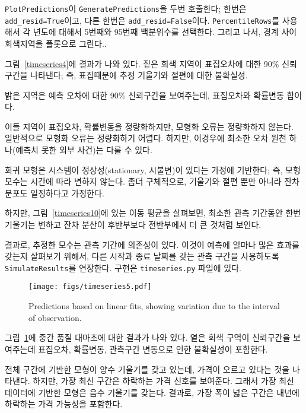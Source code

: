 {\tt PlotPredictions}이 {\tt GeneratePredictions}을 두번 호출한다; 한번은 \verb"add_resid=True"이고, 다른 한번은 \verb"add_resid=False"이다.
{\tt PercentileRows}를 사용해서 각 년도에 대해서 5번째와 95번째 백분위수를 선택한다. 그리고 나서, 경계 사이 회색지역을 플롯으로 그린다..

그림~\ref{timeseries4}에 결과가 나와 있다.
짙은 회색 지역이 표집오차에 대한 90\% 신뢰구간을 나타낸다; 즉,
표집때문에 추정 기울기와 절편에 대한 불확실성.

밝은 지역은 예측 오차에 대한 90\% 신뢰구간을 보여주는데,
표집오차와 확률변동 합이다.

이들 지역이 표집오차, 확률변동을 정량화하지만, 모형화 오류는 정량화하지 않는다. 일반적으로 모형화 오류는 정량화하기 어렵다. 하지만, 이경우에 최소한 오차 원천 하나(예측치 못한 외부 사건)는 다룰 수 있다.

회귀 모형은 시스템이 정상성(stationary, 시불변)이 있다는 가정에 기반한다; 즉, 모형 모수는 시간에 따라 변하지 않는다.
좀더 구체적으로, 기울기와 절편 뿐만 아니라 잔차 분포도 일정하다고 가정한다.

하지만, 그림~\ref{timeseries10}에 있는 이동 평균을 살펴보면, 최소한 관측 기간동안 한번 기울기는 변하고 잔차 분산이 후반부보다 전반부에서 더 큰 것처럼 보인다.

결과로, 추정한 모수는 관측 기간에 의존성이 있다.
이것이 예측에 얼마나 많은 효과를 갖는지 살펴보기 위해서,
다른 시작과 종료 날짜를 갖는 관측 구간을 사용하도록 {\tt SimulateResults}를 연장한다.
구현은 {\tt timeseries.py} 파일에 있다.

\begin{figure}
\centerline{\texttt{[image: figs/timeseries5.pdf]}}
\caption{Predictions based on linear fits, showing
variation due to the interval of observation.}
\label{timeseries5}
\end{figure}

그림~\ref{timeseries5}에 중간 품질 대마초에 대한 결과가 나와 있다.
옅은 회색 구역이 신뢰구간을 보여주는데 표집오차, 확률변동, 관측구간 변동으로 인한 불확실성이 포함한다.

전체 구간에 기반한 모형이 양수 기울기를 갖고 있는데, 가격이 오르고 있다는 것을 나타낸다. 하지만, 가장 최신 구간은 하락하는 가격 신호를 보여준다. 
그래서 가장 최신 데이터에 기반한 모형은 음수 기울기를 갖는다.
결과로, 가장 폭이 넗은 구간은 내년에 하락하는 가격 가능성을 포함한다.


